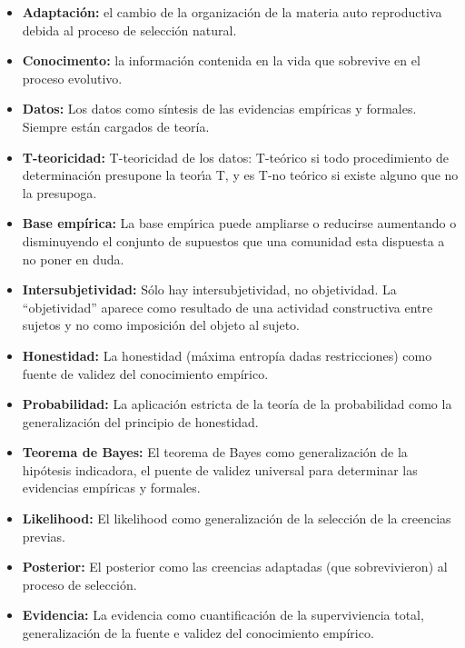\documentclass[a4paper,10pt]{book}
\begin{document}
\begin{itemize}
\setlength\itemsep{-0.1cm}
 \item \textbf{Adaptación:} el cambio de la organización de la materia auto reproductiva debida al proceso de selección natural.
 \item \textbf{Conocimento:} la información contenida en la vida que sobrevive en el proceso evolutivo.
 \item \textbf{Datos:} Los datos como síntesis de las evidencias empíricas y formales. Siempre están cargados de teoría.
 \item \textbf{T-teoricidad:} T-teoricidad de los datos: T-teórico si todo procedimiento de determinación presupone la teorı́a T, y es T-no teórico si existe alguno que no la presupoga.
 \item \textbf{Base empírica:} La base empı́rica puede ampliarse o  reducirse aumentando o disminuyendo el conjunto de supuestos que una comunidad esta dispuesta a no poner en duda.
 \item \textbf{Intersubjetividad:} Sólo hay intersubjetividad, no objetividad. La ``objetividad'' aparece como resultado de una actividad constructiva entre sujetos y no como imposición del objeto al sujeto.
 \item \textbf{Honestidad:} La honestidad (máxima entropía dadas restricciones) como fuente de validez del conocimiento empírico.
 \item \textbf{Probabilidad:} La aplicación estricta de la teoría de la probabilidad como la generalización del principio de honestidad.
 \item \textbf{Teorema de Bayes:} El teorema de Bayes como generalización de la hipótesis indicadora, el puente de validez universal para determinar las evidencias empíricas y formales.
 \item \textbf{Likelihood:} El likelihood como generalización de la selección de la creencias previas.
 \item \textbf{Posterior:} El posterior como las creencias adaptadas (que sobrevivieron) al proceso de selección.
 \item \textbf{Evidencia:} La evidencia como cuantificación de la superviviencia total, generalización de la fuente e validez del conocimiento empírico.
\end{itemize}
\end{document}
